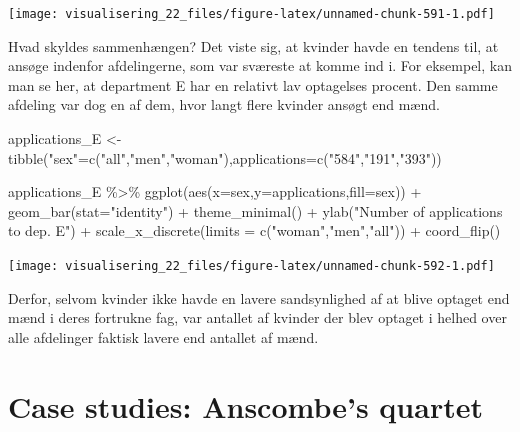\documentclass[
]{book}
\newenvironment{Shaded}{\begin{snugshade}}{\end{snugshade}}
\newcommand{\AttributeTok}[1]{\textcolor[rgb]{0.77,0.63,0.00}{#1}}
\newcommand{\FunctionTok}[1]{\textcolor[rgb]{0.00,0.00,0.00}{#1}}
\newcommand{\NormalTok}[1]{#1}
\newcommand{\OtherTok}[1]{\textcolor[rgb]{0.56,0.35,0.01}{#1}}
\newcommand{\SpecialCharTok}[1]{\textcolor[rgb]{0.00,0.00,0.00}{#1}}
\newcommand{\StringTok}[1]{\textcolor[rgb]{0.31,0.60,0.02}{#1}}
\begin{document}
\texttt{[image: visualisering\_22\_files/figure-latex/unnamed-chunk-591-1.pdf]}

Hvad skyldes sammenhængen? Det viste sig, at kvinder havde en tendens til, at ansøge indenfor afdelingerne, som var sværeste at komme ind i. For eksempel, kan man se her, at department E har en relativt lav optagelses procent. Den samme afdeling var dog en af dem, hvor langt flere kvinder ansøgt end mænd.

\begin{Shaded}
\begin{Highlighting}[]
\NormalTok{applications\_E }\OtherTok{\textless{}{-}} \FunctionTok{tibble}\NormalTok{(}\StringTok{"sex"}\OtherTok{=}\FunctionTok{c}\NormalTok{(}\StringTok{"all"}\NormalTok{,}\StringTok{"men"}\NormalTok{,}\StringTok{"woman"}\NormalTok{),}\AttributeTok{applications=}\FunctionTok{c}\NormalTok{(}\StringTok{"584"}\NormalTok{,}\StringTok{"191"}\NormalTok{,}\StringTok{"393"}\NormalTok{))}


\NormalTok{applications\_E }\SpecialCharTok{\%\textgreater{}\%} \FunctionTok{ggplot}\NormalTok{(}\FunctionTok{aes}\NormalTok{(}\AttributeTok{x=}\NormalTok{sex,}\AttributeTok{y=}\NormalTok{applications,}\AttributeTok{fill=}\NormalTok{sex)) }\SpecialCharTok{+} 
  \FunctionTok{geom\_bar}\NormalTok{(}\AttributeTok{stat=}\StringTok{"identity"}\NormalTok{) }\SpecialCharTok{+} 
  \FunctionTok{theme\_minimal}\NormalTok{() }\SpecialCharTok{+} 
  \FunctionTok{ylab}\NormalTok{(}\StringTok{"Number of applications to dep. E"}\NormalTok{) }\SpecialCharTok{+}
  \FunctionTok{scale\_x\_discrete}\NormalTok{(}\AttributeTok{limits =} \FunctionTok{c}\NormalTok{(}\StringTok{"woman"}\NormalTok{,}\StringTok{"men"}\NormalTok{,}\StringTok{"all"}\NormalTok{)) }\SpecialCharTok{+}
  \FunctionTok{coord\_flip}\NormalTok{()}
\end{Highlighting}
\end{Shaded}

\texttt{[image: visualisering\_22\_files/figure-latex/unnamed-chunk-592-1.pdf]}

Derfor, selvom kvinder ikke havde en lavere sandsynlighed af at blive optaget end mænd i deres fortrukne fag, var antallet af kvinder der blev optaget i helhed over alle afdelinger faktisk lavere end antallet af mænd.

\hypertarget{case-studies-anscombes-quartet}{%
\section{Case studies: Anscombe's quartet}\label{case-studies-anscombes-quartet}}
\end{document}
